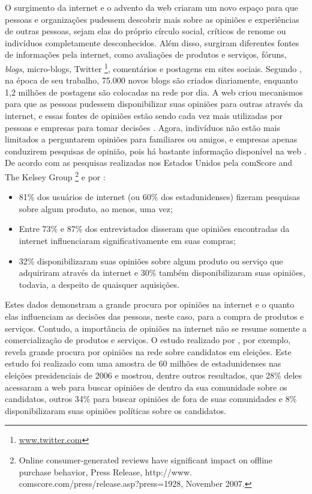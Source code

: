 \documentclass[template.tex]{subfiles}
\begin{document}
O surgimento da internet e o advento da web criaram um novo espaço para que pessoas e organizações pudessem descobrir mais sobre as opiniões e experiências de outras pessoas, sejam elas do próprio círculo social, críticos de renome ou indivíduos completamente desconhecidos. Além disso, surgiram diferentes fontes de informações pela internet, como avaliações de produtos e serviços, fóruns, \textit{blogs}, micro-blogs, Twitter \footnote{\url{www.twitter.com}}, comentários e postagens em sites sociais. Segundo \cite{kim2006forrester}, na época de seu trabalho, 75.000 novos blogs são criados diariamente, enquanto 1,2 milhões de postagens são colocadas na rede por dia.  A web criou mecanismos para que as pessoas pudessem disponibilizar suas opiniões para outras através da internet, e essas fontes de opiniões estão sendo cada vez mais utilizadas por pessoas e empresas para tomar decisões \cite{bing:2012, pang:2008}. Agora, indivíduos não estão mais limitados a perguntarem opiniões para familiares ou amigos, e empresas apenas conduzirem pesquisas de opinião, pois há bastante informação disponível na web \cite{bing:2012}. De acordo com as pesquisas realizadas nos Estados Unidos pela comScore and The Kelsey Group \footnote{Online consumer-generated reviews have significant impact on offline purchase behavior, Press Release, http://www. comscore.com/press/release.asp?press=1928, November 2007.} e por \cite{horrigan2008online}:

\begin{itemize}
\item 81\% dos usuários de internet (ou 60\% dos estadunidenses) fizeram pesquisas sobre algum produto, ao menos, uma vez;
\item Entre 73\% e 87\% dos entrevistados disseram que opiniões encontradas da internet influenciaram significativamente em suas compras;
\item 32\% disponibilizaram suas opiniões sobre algum produto ou serviço que adquiriram através da internet e 30\% também disponibilizaram suas opiniões, todavia, a despeito de quaisquer aquisições.

\end{itemize}

Estes dados demonstram a grande procura por opiniões na internet e o quanto elas influenciam as decisões das pessoas, neste caso, para a compra de produtos e serviços. Contudo, a importância de opiniões na internet não se resume somente a comercialização de produtos e serviços. O estudo realizado por \cite{rainie2007election}, por exemplo, revela grande procura por opiniões na rede sobre candidatos em eleições. Este estudo foi realizado com uma amostra de 60 milhões de estadunidenses nas eleições presidenciais de 2006 e mostrou, dentre outros resultados, que 28\% deles acessaram a web para buscar opiniões de dentro da sua comunidade sobre os candidatos, outros 34\% para buscar opiniões de fora de suas comunidades e 8\% disponibilizaram suas opiniões políticas sobre os candidatos. 
\end{document}
